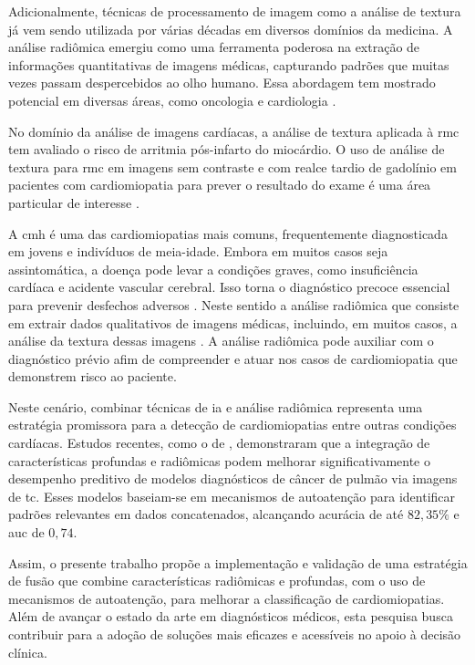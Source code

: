 Adicionalmente, técnicas de processamento de imagem como a análise de textura já vem sendo utilizada por várias décadas em diversos domínios da medicina. A análise radiômica emergiu como uma ferramenta poderosa na extração de informações quantitativas de imagens médicas, capturando padrões que muitas vezes passam despercebidos ao olho humano. Essa abordagem tem mostrado potencial em diversas áreas, como oncologia e cardiologia \cite{schofieldTextureAnalysisCardiovascular2019a}.

No domínio da análise de imagens cardíacas, a análise de textura aplicada à \gls{rmc} tem avaliado o risco de arritmia pós-infarto do miocárdio. O uso de análise de textura para \gls{rmc} em imagens sem contraste e com realce tardio de gadolínio em pacientes com cardiomiopatia para prever o resultado do exame é uma área particular de interesse \cite{schofieldTextureAnalysisCardiovascular2019a}.

A \gls{cmh} é uma das cardiomiopatias mais comuns, frequentemente diagnosticada em jovens e indivíduos de meia-idade. Embora em muitos casos seja assintomática, a doença pode levar a condições graves, como insuficiência cardíaca e acidente vascular cerebral. Isso torna o diagnóstico precoce essencial para prevenir desfechos adversos \cite{kwonComparisonMortalityCause2022}. Neste sentido a análise radiômica que consiste em extrair dados qualitativos de imagens médicas, incluindo, em muitos casos, a análise da textura dessas imagens \cite{lambinRadiomicsExtractingMore2012}. A análise radiômica pode auxiliar com o diagnóstico prévio afim de compreender e atuar nos casos de cardiomiopatia que demonstrem risco ao paciente.

Neste cenário, combinar técnicas de \gls{ia} e análise radiômica representa uma estratégia promissora para a detecção de cardiomiopatias entre outras condições cardíacas. Estudos recentes, como o de , demonstraram que a integração de características profundas e radiômicas podem melhorar significativamente o desempenho preditivo de modelos diagnósticos de câncer de pulmão via imagens de \gls{tc}. Esses modelos baseiam-se em mecanismos de autoatenção para identificar padrões relevantes em dados concatenados, alcançando acurácia de até $82,35\%$ e \gls{auc} de $0,74$.

Assim, o presente trabalho propõe a implementação e validação de uma estratégia de fusão que combine características radiômicas e profundas, com o uso de mecanismos de autoatenção, para melhorar a classificação de cardiomiopatias. Além de avançar o estado da arte em diagnósticos médicos, esta pesquisa busca contribuir para a adoção de soluções mais eficazes e acessíveis no apoio à decisão clínica.

